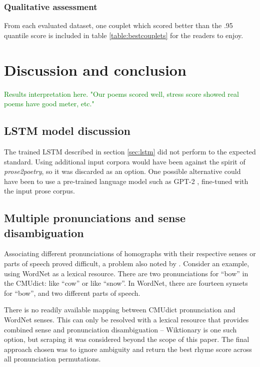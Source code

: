 \documentclass[11pt,a4paper]{article}
\begin{document}
\subsubsection{Qualitative assessment}

From each evaluated dataset, one couplet which scored better than the .95 quantile score is included in table \ref{table:bestcouplets} for the readers to enjoy.

\section{Discussion and conclusion}
\label{sec:discconc}

\textcolor{green}{
Results interpretation here. "Our poems scored well, stress score showed real poems have good meter, etc."
}

\subsection{LSTM model discussion}
\label{sec:discconclstm}

The trained LSTM described in section \ref{sec:lstm} did not perform to the expected standard. Using additional input corpora would have been against the spirit of \textit{prose2poetry}, so it was discarded as an option. One possible alternative could have been to use a pre-trained language model such as GPT-2 \cite{gpt2}, fine-tuned with the input prose corpus.

\subsection{Multiple pronunciations and sense disambiguation}
\label{sec:synset}

Associating different pronunciations of homographs with their respective senses or parts of speech proved difficult, a problem also noted by \citet{hopkins-kiela-2017}. Consider an example, using WordNet \cite{wordnet} as a lexical resource. There are two pronunciations for ``bow'' in the CMUdict: like ``cow'' or like ``snow''. In WordNet, there are fourteen synsets for ``bow'', and two different parts of speech.

There is no readily available mapping between CMUdict pronunciation and WordNet senses. This can only be resolved with a lexical resource that provides combined sense and pronunciation disambiguation -- Wiktionary \cite{wiktionary} is one such option, but scraping it was considered beyond the scope of this paper. The final approach chosen was to ignore ambiguity and return the best rhyme score across all pronunciation permutations.
\end{document}

